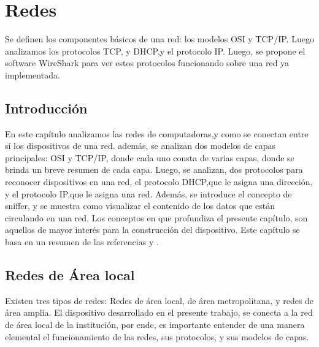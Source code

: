 \renewcommand{\chaptername}{Redes}  
\graphicspath{{parte_2/redes/}}
\chapter{Redes}
\markright{\chaptername }

\begin{center}
	\begin{tcolorbox}[colback=gray!5!white, %
		colframe=blue!75!black,
		title= \center{\Large{resumen}} ]
		Se definen los componentes básicos de una red: los modelos OSI y TCP/IP. Luego analizamos los protocolos TCP, y DHCP,y el protocolo IP. Luego, se propone el software WireShark para ver estos protocolos funcionando sobre una red ya implementada. 

	\end{tcolorbox}
\end{center}    
\section{Introducción} 
En este capítulo analizamos las redes de computadoras,y como se conectan entre sí los dispositivos de una red. además, se analizan dos modelos de capas principales: OSI y TCP/IP, donde cada uno consta de varias capas, donde se brinda un breve resumen de cada capa. 
Luego, se analizan, dos protocolos para reconocer dispositivos en una red, el protocolo DHCP,que le asigna una dirección, y el protocolo IP,que le asigna una red. Además, se introduce el concepto de sniffer, y se muestra como visualizar el contenido de los datos que están circulando en una red. Los conceptos en que profundiza el presente capítulo, son aquellos de mayor interés para la construcción del dispositivo. Este capítulo se basa en un resumen de las referencias \cite{Stallings2004} y \cite{Tanenbaum2003}.  


\section{Redes de Área local }
Existen tres tipos de redes: Redes de área local, de área metropolitana, y redes de área amplia. El dispositivo desarrollado en el presente trabajo, se conecta a la red de área local de la institución, por ende, es importante entender de una manera elemental el funcionamiento de las redes, sus protocolos, y sus modelos de capas.   

